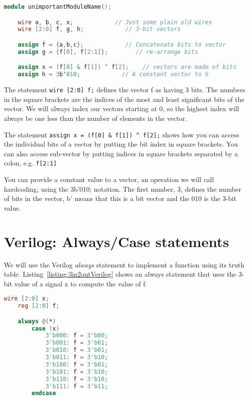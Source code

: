 \begin{lstlisting}[language=Verilog,
 caption={Verilog code which illustrates vector manipulations and declarations.},
 label={listing:vectorManipulation},
 frame=single]
module unimportantModuleName();

    wire a, b, c, x;            // Just some plain old wires
    wire [2:0] f, g, h;            // 3-bit vectors

    assign f = {a,b,c};            // Concatenate bits to vector
    assign g = {f[0], f[2:1]};        // re-arrange bits

    assign x = (f[0] & f[1]) ^ f[2];    // vectors are made of bits
    assign h = 3b'010;            // A constant vector to h
\end{lstlisting}

The statement \verb+wire [2:0] f;+ defines the vector f as having 3 bits.
The numbers in the square brackets are the indices of the most and least significant
bits of the vector. We will always index our vectors starting at 0, so
the highest index will always be one less than the number of elements in
the vector.

The statement \verb+assign x = (f[0] & f[1]) ^ f[2];+ shows how
you can access the individual bits of a vector by putting the bit index in
square brackets. You can also access sub-vector by putting indices in
square brackets separated by a colon, e.g. \verb+f[2:1]+

You can provide a constant value to a vector, an operation we will call
hardcoding, using the 3b'010; notation. The first number, 3, defines the
number of bits in the vector, b' means that this is a bit vector and the 010 is
the 3-bit value.

\section{Verilog: Always/Case statements}

We will use the Verilog \emph{always} statement to implement a function
using its truth table. Listing~\ref{listing:3in2outVerilog} shows an always
statement that uses the 3-bit value of a signal x to compute the value of f.

\begin{lstlisting}[language=Verilog,
 caption={A 3-input, 2-output function realized with an always statement.
 Can you figure out how the output was computed?},
 label={listing:3in2outVerilog},
 frame=single]
    wire [2:0] x;
    reg [2:0] f;

    always @(*)
        case (x)
            3'b000: f = 3'b00;
            3'b001: f = 3'b01;
            3'b010: f = 3'b01;
            3'b011: f = 3'b10;
            3'b100: f = 3'b01;
            3'b101: f = 3'b10;
            3'b110: f = 3'b10;
            3'b111: f = 3'b11;
        endcase
\end{lstlisting}


